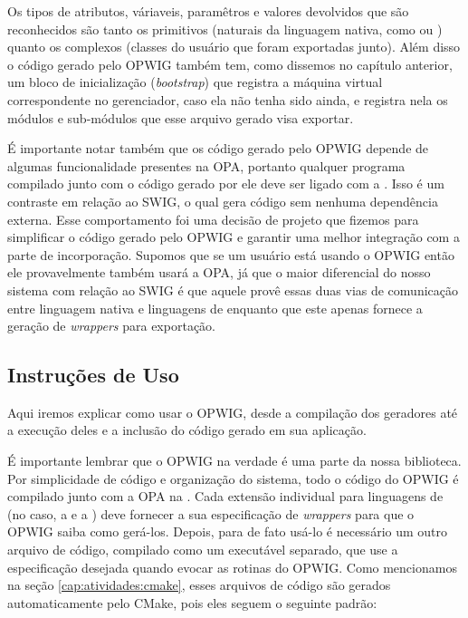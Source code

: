 Os tipos de atributos, váriaveis, paramêtros e valores devolvidos que são reconhecidos
são tanto os primitivos (naturais da linguagem nativa, como  ou )
quanto os complexos (classes do usuário que foram exportadas junto). Além disso o código
gerado pelo OPWIG também tem, como dissemos no capítulo anterior, um bloco de inicialização
(\textit{bootstrap}) que registra a máquina virtual correspondente no gerenciador,
caso ela não tenha sido ainda, e registra nela os módulos e sub-módulos que esse
arquivo gerado visa exportar.

É importante notar também que os código gerado pelo OPWIG depende de algumas funcionalidade
presentes na OPA, portanto qualquer programa compilado junto com o código gerado por ele deve
ser ligado com a . Isso é um contraste em relação ao SWIG, o qual gera
código sem nenhuma dependência externa. Esse comportamento foi uma decisão de
projeto que fizemos para simplificar o código gerado pelo OPWIG e garantir uma melhor integração
com a parte de incorporação. Supomos que se um usuário está usando o OPWIG então ele provavelmente
também usará a OPA, já que o maior diferencial do nosso sistema com relação ao SWIG é que aquele provê
essas duas vias de comunicação entre linguagem nativa e linguagens de \script{} enquanto que este
apenas fornece a geração de \textit{wrappers} para exportação.

\subsection{Instruções de Uso}
Aqui iremos explicar como usar o OPWIG, desde a compilação dos geradores até a execução
deles e a inclusão do código gerado em sua aplicação.

É importante lembrar que o OPWIG na verdade é uma parte da nossa biblioteca. Por
simplicidade de código e organização do sistema, todo o código do OPWIG é compilado
junto com a OPA na . Cada extensão individual para linguagens de \script{}
(no caso, a  e a ) deve
fornecer a sua especificação de \textit{wrappers} para que o OPWIG saiba como gerá-los.
Depois, para de fato usá-lo é necessário um outro arquivo de código, compilado
como um executável separado, que use a especificação desejada quando evocar as rotinas
do OPWIG. Como mencionamos na seção \ref{cap:atividades:cmake}, esses arquivos de código
são gerados automaticamente pelo CMake, pois eles seguem o seguinte padrão:

